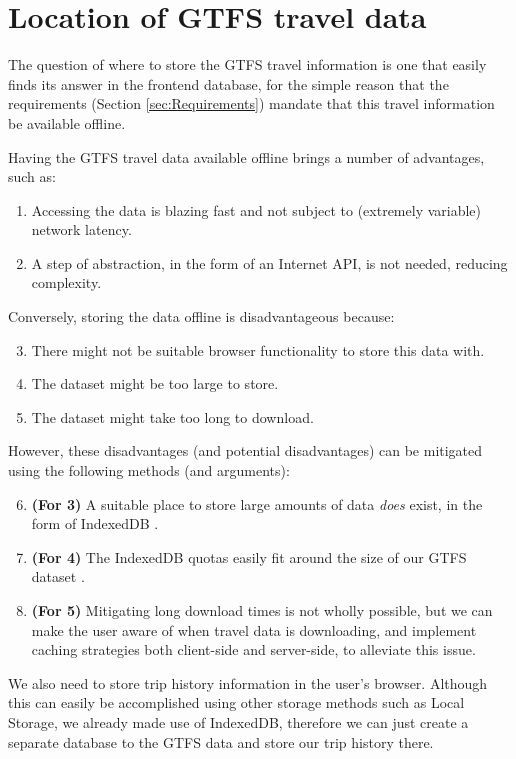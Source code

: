 \section{Location of GTFS travel data}

The question of where to store the GTFS travel information is one that easily finds its answer in the frontend database, for the simple reason that the requirements (Section \ref{sec:Requirements}) mandate that this travel information be available offline.

Having the GTFS travel data available offline brings a number of advantages, such as:
\begin{enumerate}
    \item Accessing the data is blazing fast and not subject to (extremely variable) network latency.
    \item A step of abstraction, in the form of an Internet API, is not needed, reducing complexity.
\end{enumerate}

Conversely, storing the data offline is disadvantageous because:
\begin{enumerate}
    \setcounter{enumi}{2}
    \item There might not be suitable browser functionality to store this data with.
    \item The dataset might be too large to store.
    \item The dataset might take too long to download.
\end{enumerate}

However, these disadvantages (and potential disadvantages) can be mitigated using the following methods (and arguments):
\begin{enumerate}
    \setcounter{enumi}{5}
    \item \textbf{(For 3)} A suitable place to store large amounts of data \textit{does} exist, in the form of IndexedDB \cite{IndexedDBIntro}.
    \item \textbf{(For 4)} The IndexedDB quotas easily fit around the size of our GTFS dataset \cite{IndexedDBLimits}.
    \item \textbf{(For 5)} Mitigating long download times is not wholly possible, but we can make the user aware of when travel data is downloading, and implement caching strategies both client-side and server-side, to alleviate this issue.
\end{enumerate}

We also need to store trip history information in the user's browser. Although this can easily be accomplished using other storage methods such as Local Storage, we already made use of IndexedDB, therefore we can just create a separate database to the GTFS data and store our trip history there.

